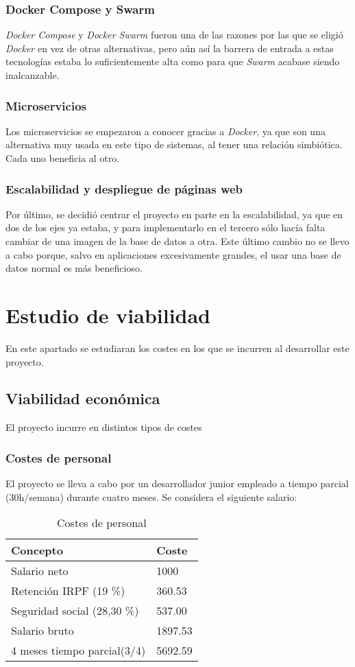 \subsubsection{Docker Compose y Swarm}
\emph{Docker Compose} y \emph{Docker Swarm} fueron una de las razones por las que se eligió \emph{Docker} en vez de otras alternativas, pero aún así la barrera de entrada a estas tecnologías estaba lo suficientemente alta como para que \emph{Swarm} acabase siendo inalcanzable.

\subsubsection{Microservicios}
Los microservicios se empezaron a conocer gracias a \emph{Docker}, ya que son una alternativa muy usada en este tipo de sistemas, al tener una relación simbiótica. Cada uno beneficia al otro.

\subsubsection{Escalabilidad y despliegue de páginas web}
Por último, se decidió centrar el proyecto en parte en la escalabilidad, ya que en dos de los ejes ya estaba, y para implementarlo en el tercero sólo hacía falta cambiar de una imagen de la base de datos a otra. Este último cambio no se llevo a cabo porque, salvo en aplicaciones excesivamente grandes, el usar una base de datos normal es más beneficioso.

\section{Estudio de viabilidad}
En este apartado se estudiaran los costes en los que se incurren al desarrollar este proyecto.

\subsection{Viabilidad económica}
El proyecto incurre en distintos tipos de costes

\subsubsection{Costes de personal}
El proyecto se lleva a cabo por un desarrollador junior empleado a tiempo parcial (30h/semana) durante cuatro meses. Se considera el siguiente salario:
\FloatBarrier
\begin{table}[]
\centering
\begin{tabular}{@{}ll@{}}
\toprule
Concepto & Coste \\ \midrule
Salario neto & 1000 \\
Retención IRPF (19 \%) & 360.53 \\
Seguridad social (28,30 \%) & 537.00 \\
Salario bruto & 1897.53 \\ \midrule
4 meses tiempo parcial(3/4) & 5692.59 \\ \bottomrule
\end{tabular}
\caption{Costes de personal}
\label{Salario}
\end{table}
\FloatBarrier
